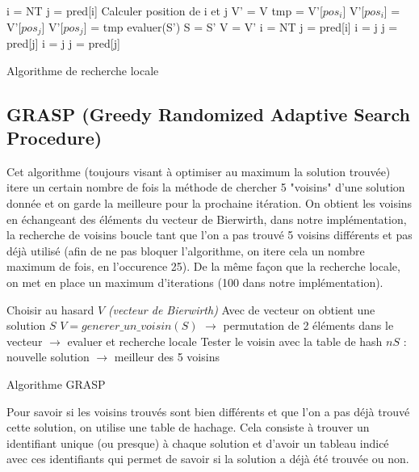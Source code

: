 \documentclass{article}
\begin{document}
\vspace{0.25cm}
\begin{algorithm}[H]
  i = NT\;
  j = pred[i]\;
  {
    {
      Calculer position de i et j\;
      V' = V\;
      tmp = V'[$pos_i$]\;
      V'[$pos_i$] = V'[$pos_j$]\;
      V'[$pos_j$] = tmp\;
      evaluer(S')\;
      {
        S = S'\;
        V = V'\;
        i = NT\;
        j = pred[i]\;
      }{
        i = j\;
        j = pred[j]\;
      }
    }{
      i = j\;
      j = pred[j]\;
    }
  }
  \caption{Algorithme de recherche locale}
\end{algorithm}

\subsection{GRASP (Greedy Randomized Adaptive Search Procedure)}
Cet algorithme (toujours visant à optimiser au maximum la solution trouvée) itere un certain
nombre de fois la méthode de chercher 5 "voisins" d'une solution donnée et on garde la meilleure pour
la prochaine itération. On obtient les voisins en échangeant des éléments du vecteur de Bierwirth, 
dans notre implémentation, la recherche de voisins boucle tant que l'on a pas trouvé
5 voisins différents et pas déjà utilisé (afin de ne pas bloquer l'algorithme,
on itere cela un nombre maximum de fois, en l'occurence 25).
De la même façon que la recherche locale, on met en place un maximum d'iterations
(100 dans notre implémentation).

\vspace{0.25cm}
\begin{algorithm}[H]
  {
    Choisir au hasard $V$ \emph{(vecteur de Bierwirth)}\;
    Avec de vecteur on obtient une solution $S$\;
    {
      $V = generer\_un\_voisin(S)$\;
      $\rightarrow$ permutation de 2 éléments dans le vecteur\;
      $\rightarrow$ evaluer et recherche locale\;
      Tester le voisin avec la table de hash\;
    }
    $nS$ : nouvelle solution $\rightarrow$ meilleur des 5 voisins\;
  }
  \caption{Algorithme GRASP}
\end{algorithm}

\newpage
Pour savoir si les voisins trouvés sont bien différents et que l'on a pas déjà trouvé cette
solution, on utilise une table de hachage. Cela consiste à trouver un identifiant unique
(ou presque) à chaque solution et d'avoir un tableau indicé avec ces identifiants qui permet
de savoir si la solution a déjà été trouvée ou non.
\end{document}
